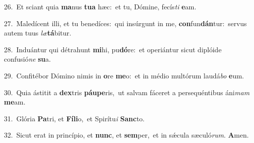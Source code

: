 {\numbfont\textcolor{\numbcolor}{26.}}~Et sciant quia \textbf{ma}\-nus \textbf{tu}\-\textbf{a} hæc:~\star et tu, Dómine, fecís\textit{ti} \textbf{e}\-am.\par
{\numbfont\textcolor{\numbcolor}{27.}}~Maledícent illi, et tu benedíces:~\dagger qui insúrgunt in me, \textbf{con}\-fun\-\textbf{dán}\-tur:~\star servus autem tuus \textit{læ}\-\textbf{tá}bitur.\par
{\numbfont\textcolor{\numbcolor}{28.}}~Induántur qui détrahunt \textbf{mi}\-hi, pu\-\textbf{dó}\-re:~\star et operiántur sicut diplóide confusió\textit{ne} \textbf{su}\-a.\par
{\numbfont\textcolor{\numbcolor}{29.}}~Confitébor Dómino nimis in \textbf{o}\-re \textbf{me}\-o:~\star et in médio multórum laudá\textit{bo} \textbf{e}\-um.\par
{\numbfont\textcolor{\numbcolor}{30.}}~Quia ástitit a \textbf{dex}\-tris \textbf{páu}\-\textbf{pe}ris,~\star ut salvam fáceret a persequéntibus áni\textit{mam} \textbf{me}\-am.\par
{\numbfont\textcolor{\numbcolor}{31.}}~Glória \textbf{Pa}\-tri, et \textbf{Fí}\-\textbf{li}o,~\star et Spirítu\textit{i} \textbf{Sanc}\-to.\par
{\numbfont\textcolor{\numbcolor}{32.}}~Sicut erat in princípio, et \textbf{nunc}\-, et \textbf{sem}\-per,~\star et in sǽcula sæculó\-\textit{rum}\-. \textbf{A}\-men.\par
